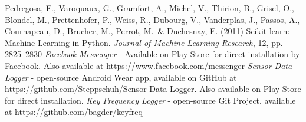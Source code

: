 \documentclass[10pt,twocolumn,letterpaper]{article}
\begin{document}
\begin{thebibliography}{1}
   Pedregosa, F., Varoquaux, G., Gramfort, A., Michel, V., Thirion, B., Grisel, O., Blondel, M., Prettenhofer, P., Weiss, R., Dubourg, V., Vanderplas, J., Passos, A., Cournapeau, D., Brucher, M., Perrot, M.\ \& Duchesnay, E. (2011) Scikit-learn: Machine Learning in Python. {\it Journal of Machine Learning Research}, 12, pp. 2825--2830
   {\it Facebook Messenger} - Available on Play Store for direct installation by Facebook. Also available at \url{https://www.facebook.com/messenger}
   {\it Sensor Data Logger} - open-source Android Wear app, available on GitHub at \url{https://github.com/Steppschuh/Sensor-Data-Logger}. Also available on Play Store for direct installation.
   {\it Key Frequency Logger} - open-source Git Project, available at \url{https://github.com/bagder/keyfreq}
\end{thebibliography}
\end{document}
